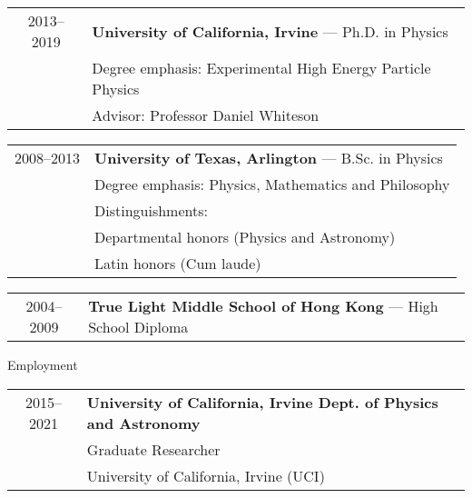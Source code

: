 \hspace{0.18in}
\begin{tabular}{c|l}
     2013--2019 & {\bf{University of California, Irvine}} --- Ph.D. in Physics \\
			  & \hspace{0.5cm}Degree emphasis: Experimental High Energy Particle Physics \\
              & \hspace{0.5cm}Advisor: Professor Daniel Whiteson
\end{tabular}

\vspace{0.1in}
\hspace{0.18in}
\begin{tabular}{c|l}
    2008--2013 & {\bf{University of Texas, Arlington}} --- B.Sc. in Physics \\
              & \hspace{0.5cm}Degree emphasis: Physics, Mathematics and Philosophy \\
			  & \hspace{0.5cm}Distinguishments:\\
              & \hspace{0.8cm}Departmental honors (Physics and Astronomy) \\
              & \hspace{0.8cm}Latin honors (Cum laude) \\
\end{tabular}
\vspace{0.11in}

\hspace{0.18in}
\begin{tabular}{c|l}
    2004--2009 & {\bf{True Light Middle School of Hong Kong}} --- High School Diploma \\
\end{tabular}


\vspace{0.35in}
{\Large Employment}\\
\HRule
\vspace{0.25in}
\hspace{0.18in}
\begin{tabular}{c|l}
     2015--2021 & {\bf{University of California, Irvine Dept. of Physics and Astronomy}} \\
              & Graduate Researcher \\
              & University of California, Irvine (UCI) %
\end{tabular}

